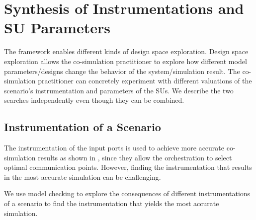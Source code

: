 
\section{Synthesis of Instrumentations and SU Parameters}\label{sc:DSE}
The framework enables different kinds of design space exploration.
Design space exploration allows the co-simulation practitioner to explore how different model parameters/designs change the behavior of the system/simulation result.
The co-simulation practitioner can concretely experiment with different valuations of the scenario's instrumentation and parameters of the SUs.
We describe the two searches independently even though they can be combined.

\subsection{Instrumentation of a Scenario}
The instrumentation of the input ports is used to achieve more accurate co-simulation results as shown in \cite{Gomes2019,Oakes2021,hansen_verification_2021}, since they allow the orchestration to select optimal communication points.
However, finding the instrumentation that results in the most accurate simulation can be challenging.%

We use model checking to explore the consequences of different instrumentations of a scenario to find the instrumentation that yields the most accurate simulation.

